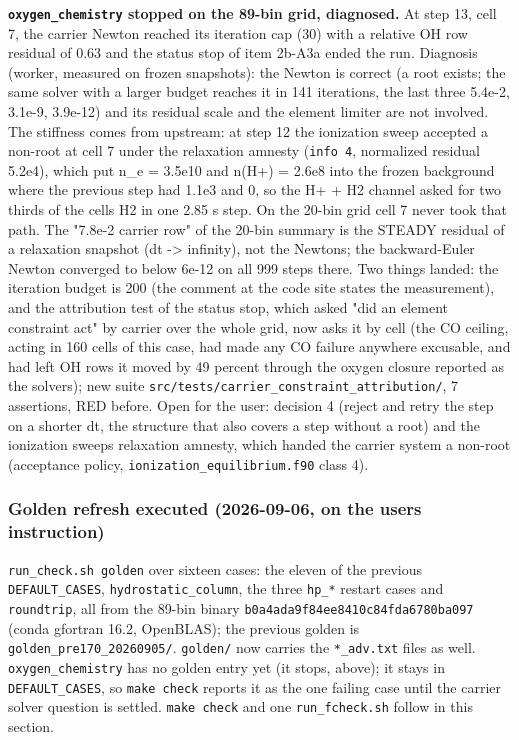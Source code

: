 \documentclass[english,a4paper]{my_memo}
\begin{document}
\textbf{\texttt{oxygen\_chemistry} stopped on the 89-bin grid, diagnosed.} At step 13,
cell 7, the carrier Newton reached its iteration cap (30) with a relative
OH row residual of 0.63 and the status stop of item 2b-A3a ended the run.
Diagnosis (worker, measured on frozen snapshots): the Newton is correct (a
root exists; the same solver with a larger budget reaches it in 141
iterations, the last three 5.4e-2, 3.1e-9, 3.9e-12) and its residual scale
and the element limiter are not involved. The stiffness comes from upstream:
at step 12 the ionization sweep accepted a non-root at cell 7 under the
relaxation amnesty (\texttt{info\ 4}, normalized residual 5.2e4), which put n\_e =
3.5e10 and n(H+) = 2.6e8 into the frozen background where the previous step
had 1.1e3 and 0, so the H+ + H2 channel asked for two thirds of the cell\textquotesingle s
H2 in one 2.85 s step. On the 20-bin grid cell 7 never took that path. The
"7.8e-2 carrier row" of the 20-bin summary is the STEADY residual of a
relaxation snapshot (dt -\textgreater{} infinity), not the Newton\textquotesingle s; the backward-Euler
Newton converged to below 6e-12 on all 999 steps there. Two things landed:
the iteration budget is 200 (the comment at the code site states the
measurement), and the attribution test of the status stop, which asked
"did an element constraint act" by carrier over the whole grid, now asks it
by cell (the CO ceiling, acting in 160 cells of this case, had made any CO
failure anywhere excusable, and had left OH rows it moved by 49 percent
through the oxygen closure reported as the solver\textquotesingle s); new suite
\texttt{src/tests/carrier\_constraint\_attribution/}, 7 assertions, RED before.
Open for the user: decision 4 (reject and retry the step on a shorter dt,
the structure that also covers a step without a root) and the ionization
sweep\textquotesingle s relaxation amnesty, which handed the carrier system a non-root
(acceptance policy, \texttt{ionization\_equilibrium.f90} class 4).

\subsubsection{Golden refresh executed (2026-09-06, on the user\textquotesingle s instruction)}\label{golden-refresh-executed-2026-09-06-on-the-users-instruction}

\texttt{run\_check.sh\ golden} over sixteen cases: the eleven of the previous
\texttt{DEFAULT\_CASES}, \texttt{hydrostatic\_column}, the three \texttt{hp\_*} restart cases and
\texttt{roundtrip}, all from the 89-bin binary \texttt{b0a4ada9f84ee8410c84fda6780ba097}
(conda gfortran 16.2, OpenBLAS); the previous golden is
\texttt{golden\_pre170\_20260905/}. \texttt{golden/} now carries the \texttt{*\_adv.txt} files as
well. \texttt{oxygen\_chemistry} has no golden entry yet (it stops, above); it stays
in \texttt{DEFAULT\_CASES}, so \texttt{make\ check} reports it as the one failing case until
the carrier solver question is settled. \texttt{make\ check} and one
\texttt{run\_fcheck.sh} follow in this section.
\end{document}
